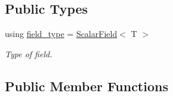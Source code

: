 \subsection*{Public Types}
\begin{DoxyCompactItemize}
\item 
using \hyperlink{classUintah_1_1PhaseField_1_1detail_1_1view_3_01ScalarField_3_01T_01_4_01_4_adfcfd1565ea23262122c7e6357e15bb0}{field\+\_\+type} = \hyperlink{structUintah_1_1PhaseField_1_1ScalarField}{Scalar\+Field}$<$ T $>$
\begin{DoxyCompactList}\small\item\em Type of field. \end{DoxyCompactList}\end{DoxyCompactItemize}
\subsection*{Public Member Functions}
